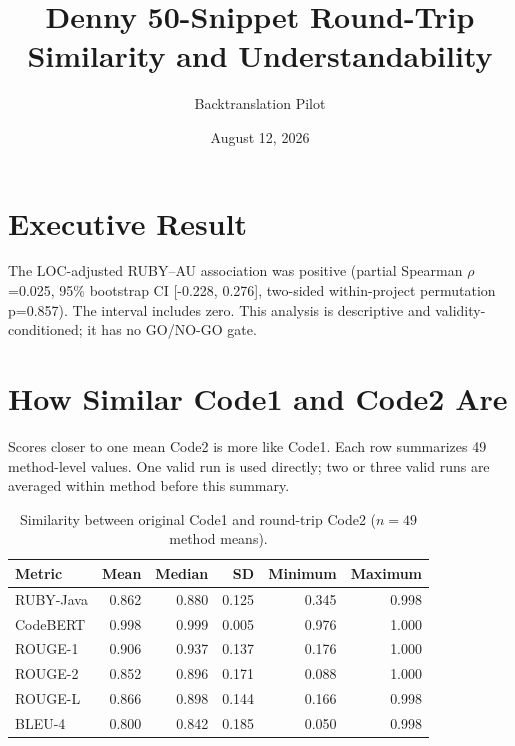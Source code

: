 \documentclass[11pt]{article}
\title{Denny 50-Snippet Round-Trip Similarity and Understandability}
\author{Backtranslation Pilot}
\date{August 12, 2026}
\begin{document}
\maketitle
\section{Executive Result}
The LOC-adjusted RUBY--AU association was positive (partial Spearman $\rho$=0.025, 95\% bootstrap CI [-0.228, 0.276], two-sided within-project permutation p=0.857). The interval includes zero.
This analysis is descriptive and validity-conditioned; it has no GO/NO-GO gate.
\section{How Similar Code1 and Code2 Are}
Scores closer to one mean Code2 is more like Code1. Each row summarizes 49 method-level values. One valid run is used directly; two or three valid runs are averaged within method before this summary.
\begin{table}[htbp]
\centering
\caption{Similarity between original Code1 and round-trip Code2 ($n=49$ method means).}
\label{tab:similarity}
\small
\begin{tabular}{lrrrrr}
\toprule
Metric & Mean & Median & SD & Minimum & Maximum \\
\midrule
RUBY-Java & 0.862 & 0.880 & 0.125 & 0.345 & 0.998 \\
CodeBERT & 0.998 & 0.999 & 0.005 & 0.976 & 1.000 \\
ROUGE-1 & 0.906 & 0.937 & 0.137 & 0.176 & 1.000 \\
ROUGE-2 & 0.852 & 0.896 & 0.171 & 0.088 & 1.000 \\
ROUGE-L & 0.866 & 0.898 & 0.144 & 0.166 & 0.998 \\
BLEU-4 & 0.800 & 0.842 & 0.185 & 0.050 & 0.998 \\
\bottomrule
\end{tabular}
\end{table}
\end{document}
